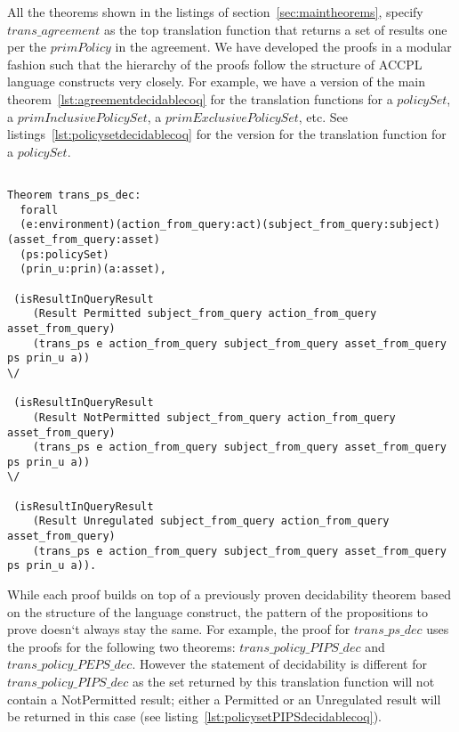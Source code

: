 All the theorems shown in the listings of section~\ref{sec:maintheorems}, specify $trans\_agreement$ as the top translation function that returns a set of results one per the $primPolicy$ in the agreement. We have developed the proofs in a modular fashion such that the hierarchy of the proofs follow the structure of \ac{ACCPL} language constructs very closely. For example, we have a version of the main theorem~\ref{lst:agreementdecidablecoq} for the translation functions for a $policySet$, a $primInclusivePolicySet$, a $primExclusivePolicySet$, etc. See listings~\ref{lst:policysetdecidablecoq} for the version for the translation function for a $policySet$.

\begin{lstlisting}

Theorem trans_ps_dec:
  forall
  (e:environment)(action_from_query:act)(subject_from_query:subject)(asset_from_query:asset)
  (ps:policySet)
  (prin_u:prin)(a:asset),

 (isResultInQueryResult 
    (Result Permitted subject_from_query action_from_query asset_from_query)
    (trans_ps e action_from_query subject_from_query asset_from_query ps prin_u a)) 
\/

 (isResultInQueryResult 
    (Result NotPermitted subject_from_query action_from_query asset_from_query)
    (trans_ps e action_from_query subject_from_query asset_from_query ps prin_u a)) 
\/

 (isResultInQueryResult 
    (Result Unregulated subject_from_query action_from_query asset_from_query)
    (trans_ps e action_from_query subject_from_query asset_from_query ps prin_u a)).

\end{lstlisting}


While each proof builds on top of a previously proven decidability theorem based on the structure of the language construct, the pattern of the propositions to prove doesn`t always stay the same. For example, the proof for $trans\_ps\_dec$ uses the proofs for the following two theorems: $trans\_policy\_PIPS\_dec$ and $trans\_policy\_PEPS\_dec$. However the statement of decidability is different for $trans\_policy\_PIPS\_dec$ as the set returned by this translation function will not contain a NotPermitted result; either a Permitted or an Unregulated result will be returned in this case (see listing~\ref{lst:policysetPIPSdecidablecoq}).

